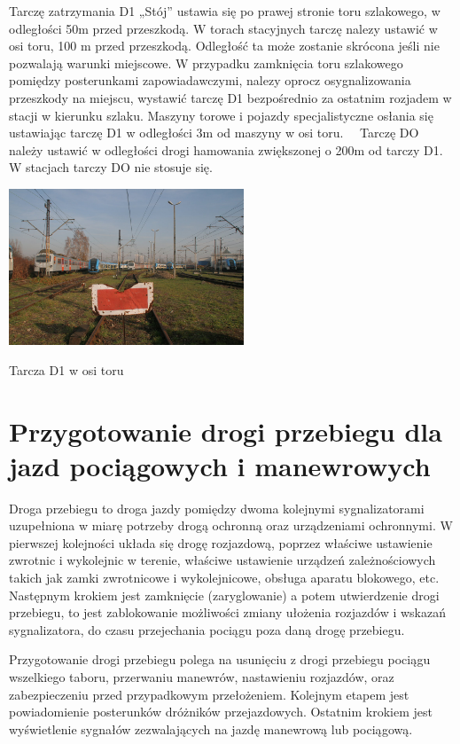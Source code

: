 Tarczę zatrzymania D1 „Stój” ustawia się po prawej stronie toru szlakowego, w odległości 50m przed przeszkodą. W torach stacyjnych tarczę nalezy ustawić w osi toru, 100 m przed przeszkodą. Odległość ta może zostanie skrócona jeśli nie pozwalają warunki miejscowe. W przypadku zamknięcia toru szlakowego pomiędzy posterunkami zapowiadawczymi, nalezy oprocz osygnalizowania przeszkody na miejscu, wystawić tarczę D1 bezpośrednio za ostatnim rozjadem w stacji w kierunku szlaku. Maszyny torowe i pojazdy specjalistyczne osłania się ustawiając tarczę D1 w odległości 3m od maszyny w osi toru.
\ \ Tarczę DO należy ustawić w odległości drogi hamowania zwiększonej o 200m od tarczy D1. W stacjach tarczy DO nie stosuje się.
	\begin{marginfigure}
	\includegraphics[width=7cm]{skryptkierownik-img/skryptkierownik-img023.jpg}
	\caption{Tarcza D1 w osi toru}
\end{marginfigure}

\chapter{Przygotowanie drogi przebiegu dla jazd pociągowych i manewrowych}


Droga przebiegu to droga jazdy pomiędzy dwoma kolejnymi sygnalizatorami uzupełniona w miarę potrzeby drogą ochronną oraz urządzeniami ochronnymi. W pierwszej kolejności układa się drogę rozjazdową, poprzez właściwe ustawienie zwrotnic i wykolejnic w terenie, właściwe ustawienie urządzeń zależnościowych takich jak zamki zwrotnicowe i wykolejnicowe, obsługa aparatu blokowego, etc. Następnym krokiem jest zamknięcie (zaryglowanie) a potem utwierdzenie drogi przebiegu, to jest zablokowanie możliwości zmiany ułożenia rozjazdów i wskazań sygnalizatora, do czasu przejechania pociągu poza daną drogę przebiegu.

Przygotowanie drogi przebiegu polega na usunięciu z drogi przebiegu pociągu wszelkiego taboru, przerwaniu manewrów, nastawieniu rozjazdów, oraz zabezpieczeniu przed przypadkowym przełożeniem. Kolejnym etapem jest powiadomienie posterunków dróżników przejazdowych. Ostatnim krokiem jest wyświetlenie sygnałów zezwalających na jazdę manewrową lub pociągową.

